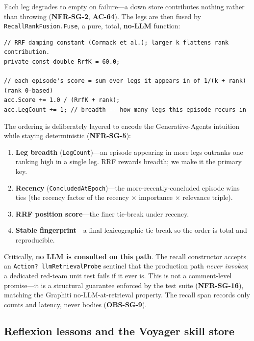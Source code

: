 \documentclass[11pt]{article}
\begin{document}
Each leg degrades to empty on failure---a down store contributes nothing rather
than throwing (\textbf{NFR-SG-2}, \textbf{AC-64}). The legs are then fused by
\texttt{RecallRankFusion.Fuse}, a pure, total, \textbf{no-LLM} function:

\begin{verbatim}
// RRF damping constant (Cormack et al.); larger k flattens rank contribution.
private const double RrfK = 60.0;

// each episode's score = sum over legs it appears in of 1/(k + rank)  (rank 0-based)
acc.Score += 1.0 / (RrfK + rank);
acc.LegCount += 1; // breadth -- how many legs this episode recurs in
\end{verbatim}

The ordering is deliberately layered to encode the Generative-Agents intuition
while staying deterministic (\textbf{NFR-SG-5}):

\begin{enumerate}
  \item \textbf{Leg breadth} (\texttt{LegCount})---an episode appearing in more
    legs outranks one ranking high in a single leg. RRF rewards breadth; we make
    it the primary key.
  \item \textbf{Recency} (\texttt{ConcludedAtEpoch})---the more-recently-concluded
    episode wins ties (the recency factor of the recency $\times$ importance
    $\times$ relevance triple).
  \item \textbf{RRF position score}---the finer tie-break under recency.
  \item \textbf{Stable fingerprint}---a final lexicographic tie-break so the order
    is total and reproducible.
\end{enumerate}

Critically, \textbf{no LLM is consulted on this path}. The recall constructor
accepts an \texttt{Action? llmRetrievalProbe} sentinel that the production path
\emph{never invokes}; a dedicated red-team unit test fails if it ever is. This is
not a comment-level promise---it is a structural guarantee enforced by the test
suite (\textbf{NFR-SG-16}), matching the Graphiti no-LLM-at-retrieval property.
The recall span records only counts and latency, never bodies
(\textbf{OBS-SG-9}).

\subsection{Reflexion lessons and the Voyager skill store}
\end{document}
